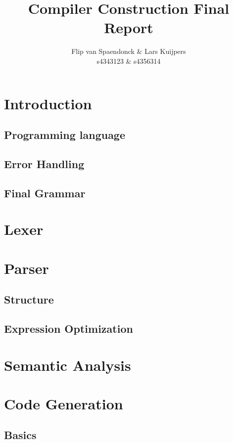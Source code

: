 \documentclass[10pt,a4paper]{article}
\author{Flip van Spaendonck \& Lars Kuijpers \\ s4343123 \& s4356314}
\title{Compiler Construction Final Report}
\begin{document}
\maketitle
\tableofcontents

\section{Introduction}
\subsection{Programming language}
\subsection{Error Handling}
\subsection{Final Grammar}


\section{Lexer}


\section{Parser}
\subsection{Structure}
\subsection{Expression Optimization}


\section{Semantic Analysis}


\section{Code Generation}
\subsection{Basics} %
\end{document}
